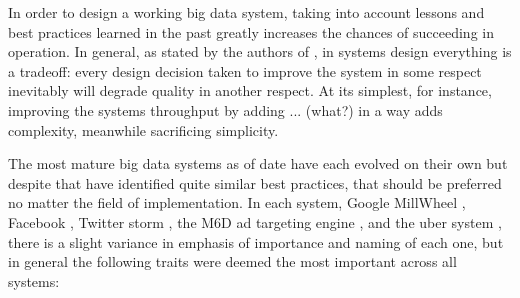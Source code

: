 







In order to design a working big data system, taking into account lessons and best practices learned in the past greatly increases the chances of succeeding in operation. In general, as stated by the authors of \cite{uber}, in systems design everything is a tradeoff: every design decision taken to improve the system in some respect inevitably will degrade quality in another respect. At its simplest, for instance, improving the systems throughput by adding ... (what?) in a way adds complexity, meanwhile sacrificing simplicity.

The most mature big data systems as of date have each evolved on their own but despite that have identified quite similar best practices, that should be preferred no matter the field of implementation. In each system, Google MillWheel \cite{millwheel}, Facebook \cite{facebook}, Twitter storm \cite{storm@twitter}, the M6D ad targeting engine \cite{designprinciples}, and the uber system \cite{uber}, there is a slight variance in emphasis of importance and naming of each one, but in general the following traits were deemed the most important across all systems:

